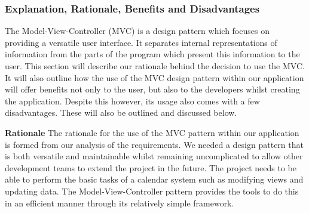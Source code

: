\documentclass[a4paper]{article}
\begin{document}
\subsubsection{Explanation, Rationale, Benefits and Disadvantages}
The Model-View-Controller (MVC) is a design pattern which focuses on providing a versatile user interface. It separates internal representations of information from the parts of the program which present this information to the user. This section will describe our rationale behind the decision to use the MVC. It will also outline how the use of the MVC design pattern within our application will offer benefits not only to the user, but also to the developers whilst creating the application. Despite this however, its usage also comes with a few disadvantages. These will also be outlined and discussed below.

\textbf{Rationale}
The rationale for the use of the MVC pattern within our application is formed from our analysis of the requirements. We needed a design pattern that is both versatile and maintainable whilst remaining uncomplicated to allow other development teams to extend the project in the future. The project needs to be able to perform the basic tasks of a calendar system such as modifying views and updating data. The Model-View-Controller pattern provides the tools to do this in an efficient manner through its relatively simple framework.
\end{document}
